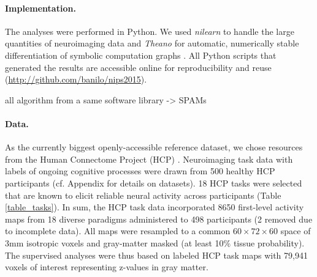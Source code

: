 \documentclass{article} %
\begin{document}
\paragraph{Implementation.}
The analyses were performed in Python.
We used \textit{nilearn} to handle
the large quantities of neuroimaging data 
\cite{abrah14}
and
\textit{Theano} for automatic, numerically stable
differentiation of symbolic computation graphs
\cite{bastien2012theano, bergstra2010theano}.
All Python scripts that generated the results are
accessible online for reproducibility and reuse
(\url{http://github.com/banilo/nips2015}).
  

all algorithm from a same software library -> SPAMs

%
\paragraph{Data.}
As the currently biggest openly-accessible reference dataset,
we chose resources from the Human Connectome Project (HCP)
\cite{barch2013}.
Neuroimaging task data with labels of ongoing cognitive processes
were drawn from 500
healthy HCP participants (cf. Appendix for details on datasets).
18 HCP tasks 
were selected that are known to elicit reliable neural activity
across participants (Table \ref{table_tasks}).
In sum, the HCP task data incorporated 8650 first-level activity maps
from 18 diverse paradigms administered to 498 participants (2 removed
due to incomplete data).
All maps were resampled to a common $60\times72\times60$ space of
3mm isotropic voxels and gray-matter masked (at least 10\% tissue
probability).
The supervised analyses were thus based on labeled HCP task maps with
79,941 voxels of interest representing z-values in gray matter.
\end{document}

